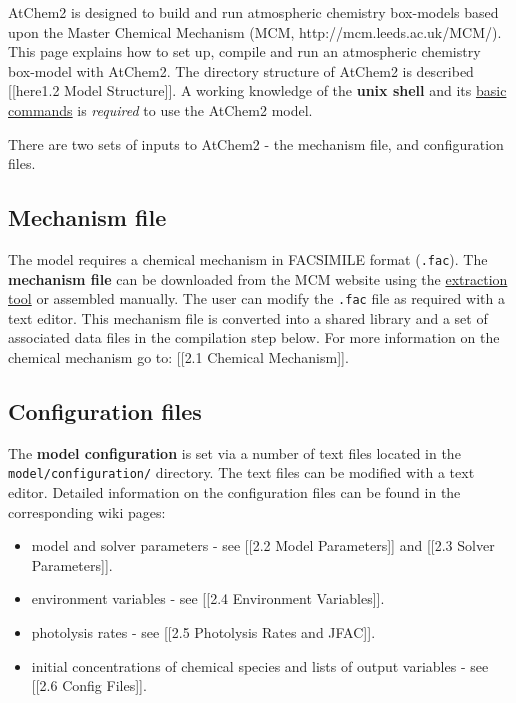 AtChem2 is designed to build and run atmospheric chemistry box-models
based upon the Master Chemical Mechanism (MCM,
http://mcm.leeds.ac.uk/MCM/). This page explains how to set up, compile
and run an atmospheric chemistry box-model with AtChem2. The directory
structure of AtChem2 is described {[}{[}here\textbar{}1.2 Model
Structure{]}{]}. A working knowledge of the \textbf{unix shell} and its
\href{https://swcarpentry.github.io/shell-novice/reference/}{basic
commands} is \emph{required} to use the AtChem2 model.

There are two sets of inputs to AtChem2 - the mechanism file, and
configuration files.

\hypertarget{mechanism-file}{%
\subsection{Mechanism file}\label{mechanism-file}}

The model requires a chemical mechanism in FACSIMILE format
(\texttt{.fac}). The \textbf{mechanism file} can be downloaded from the
MCM website using the
\href{http://mcm.leeds.ac.uk/MCMv3.3.1/extract.htt}{extraction tool} or
assembled manually. The user can modify the \texttt{.fac} file as
required with a text editor. This mechanism file is converted into a
shared library and a set of associated data files in the compilation
step below. For more information on the chemical mechanism go to:
{[}{[}2.1 Chemical Mechanism{]}{]}.

\hypertarget{configuration-files}{%
\subsection{Configuration files}\label{configuration-files}}

The \textbf{model configuration} is set via a number of text files
located in the \texttt{model/configuration/} directory. The text files
can be modified with a text editor. Detailed information on the
configuration files can be found in the corresponding wiki pages:

\begin{itemize}
\tightlist
\item
  model and solver parameters - see {[}{[}2.2 Model Parameters{]}{]} and
  {[}{[}2.3 Solver Parameters{]}{]}.
\item
  environment variables - see {[}{[}2.4 Environment Variables{]}{]}.
\item
  photolysis rates - see {[}{[}2.5 Photolysis Rates and JFAC{]}{]}.
\item
  initial concentrations of chemical species and lists of output
  variables - see {[}{[}2.6 Config Files{]}{]}.
\end{itemize}

